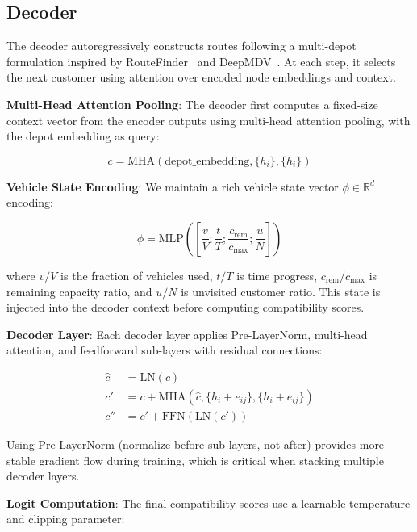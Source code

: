 \documentclass[12pt,a4paper]{article}
\begin{document}
\subsection{Decoder}

The decoder autoregressively constructs routes following a multi-depot
formulation inspired by RouteFinder~\cite{routefinder2024} and
DeepMDV~\cite{deepmdv2025}. At each step, it selects the next customer using
attention over encoded node embeddings and context.

\textbf{Multi-Head Attention Pooling}: The decoder first computes a fixed-size
context vector from the encoder outputs using multi-head attention pooling,
with the depot embedding as query:

\begin{equation}
	c = \text{MHA}(\text{depot\_embedding}, \{h_i\}, \{h_i\})
\end{equation}

\textbf{Vehicle State Encoding}: We maintain a rich vehicle state vector
$\phi \in \mathbb{R}^{d}$ encoding:

\begin{equation}
	\phi = \text{MLP}\left(\left[\frac{v}{V}; \frac{t}{T}; \frac{c_{\text{rem}}}{c_{\text{max}}}; \frac{u}{N}\right]\right)
\end{equation}

where $v/V$ is the fraction of vehicles used, $t/T$ is time progress,
$c_{\text{rem}}/c_{\text{max}}$ is remaining capacity ratio, and $u/N$ is
unvisited customer ratio. This state is injected into the decoder context
before computing compatibility scores.

\textbf{Decoder Layer}: Each decoder layer applies Pre-LayerNorm, multi-head
attention, and feedforward sub-layers with residual connections:

\begin{align}
	\hat{c} & = \text{LN}(c)                                                \\
	c'      & = c + \text{MHA}(\hat{c}, \{h_i + e_{ij}\}, \{h_i + e_{ij}\}) \\
	c''     & = c' + \text{FFN}(\text{LN}(c'))
\end{align}

Using Pre-LayerNorm (normalize before sub-layers, not after) provides more
stable gradient flow during training, which is critical when stacking multiple
decoder layers.

\textbf{Logit Computation}: The final compatibility scores use a learnable
temperature and clipping parameter:
\end{document}
